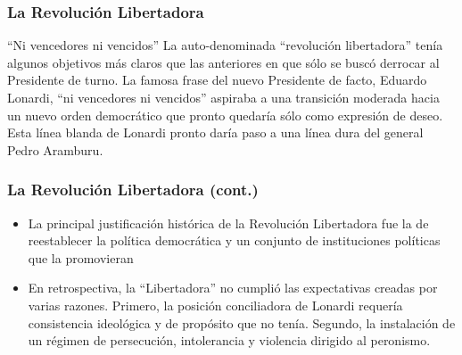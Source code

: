 \documentclass[14pt,aspectratio=169]{beamer}
\begin{document}
                       \begin{frame}\frametitle{La Revolución Libertadora}
                         \begin{block}{``Ni vencedores ni vencidos''}
                          La auto-denominada ``revolución
                          libertadora'' tenía algunos objetivos más
                          claros que las anteriores en que sólo se
                          buscó derrocar al Presidente de turno. La
                          famosa frase del nuevo Presidente de facto,
                          Eduardo Lonardi, ``ni vencedores ni
                          vencidos'' aspiraba a una transición moderada
                          hacia un
                          nuevo orden democrático que pronto quedaría
                          sólo como expresión de deseo. Esta línea
                          blanda de Lonardi pronto daría paso a una
                          línea dura del general Pedro Aramburu.  
                          \end{block}  
               \end{frame}


               \begin{frame}\frametitle{La Revolución Libertadora (cont.)}
                 \begin{itemize}\itemsep 5pt \medskip
                 \item La principal justificación histórica de la
                   Revolución Libertadora fue la de reestablecer la
                   política democrática y un
                   conjunto de instituciones políticas que la
                   promovieran
                   \item En retrospectiva, la ``Libertadora'' no
                     cumplió las expectativas creadas por varias
                     razones. Primero, la posición conciliadora de
                     Lonardi requería consistencia ideológica y de
                     propósito que no tenía. Segundo, la instalación
                     de un régimen de persecución, intolerancia y
                     violencia dirigido al peronismo. 
                   \end{itemize}
               \end{frame}
               
\end{document}
